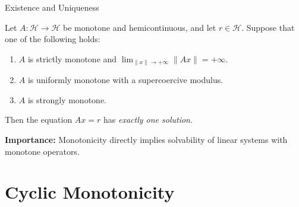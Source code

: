 \documentclass[aspectratio=169,10pt]{beamer}
\begin{document}
\begin{frame}{Existence and Uniqueness}
    \begin{example}[22.12]
        Let $A: \mathcal{H} \to \mathcal{H}$ be monotone and hemicontinuous, and let $r \in \mathcal{H}$.
        Suppose that one of the following holds:
        \begin{enumerate}
            \item[(i)] $A$ is strictly monotone and $\lim_{\|x\| \to +\infty} \|Ax\| = +\infty$.
            \item[(ii)] $A$ is uniformly monotone with a supercoercive modulus.
            \item[(iii)] $A$ is strongly monotone.
        \end{enumerate}

        Then the equation $Ax = r$ has \emph{exactly one solution}.
    \end{example}

    \vspace{0.5cm}
    \textbf{Importance:} Monotonicity directly implies solvability of linear systems with monotone operators.
\end{frame}


\section{Cyclic Monotonicity}
\end{document}
